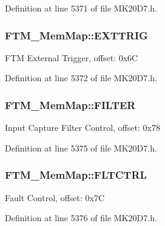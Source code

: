 Definition at line 5371 of file M\+K20\+D7.\+h.

\subsubsection[{\texorpdfstring{E\+X\+T\+T\+R\+IG}{EXTTRIG}}]{ F\+T\+M\+\_\+\+Mem\+Map\+::\+E\+X\+T\+T\+R\+IG}\hypertarget{struct_f_t_m___mem_map_afe00dccf260f10c5172a9cae5fb72d69}{}\label{struct_f_t_m___mem_map_afe00dccf260f10c5172a9cae5fb72d69}
F\+TM External Trigger, offset\+: 0x6C 

Definition at line 5372 of file M\+K20\+D7.\+h.

\subsubsection[{\texorpdfstring{F\+I\+L\+T\+ER}{FILTER}}]{ F\+T\+M\+\_\+\+Mem\+Map\+::\+F\+I\+L\+T\+ER}\hypertarget{struct_f_t_m___mem_map_af3c88a62b68d6b62793ce078ae72d31b}{}\label{struct_f_t_m___mem_map_af3c88a62b68d6b62793ce078ae72d31b}
Input Capture Filter Control, offset\+: 0x78 

Definition at line 5375 of file M\+K20\+D7.\+h.

\subsubsection[{\texorpdfstring{F\+L\+T\+C\+T\+RL}{FLTCTRL}}]{ F\+T\+M\+\_\+\+Mem\+Map\+::\+F\+L\+T\+C\+T\+RL}\hypertarget{struct_f_t_m___mem_map_ab04c5a66d20efe200fa625cbb15ab678}{}\label{struct_f_t_m___mem_map_ab04c5a66d20efe200fa625cbb15ab678}
Fault Control, offset\+: 0x7C 

Definition at line 5376 of file M\+K20\+D7.\+h.


